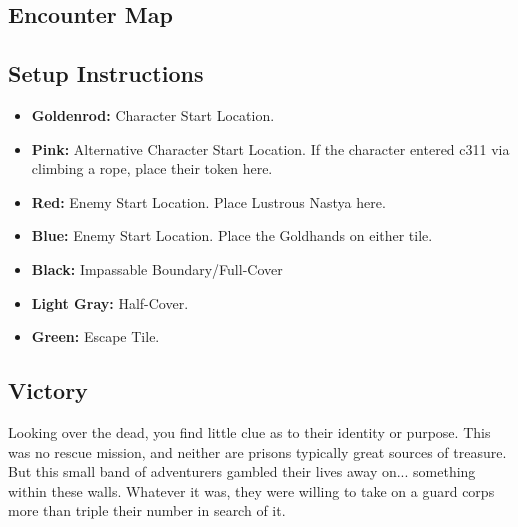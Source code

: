 \subsection*{Encounter Map}
\begin{center}
\end{center}

\subsection*{Setup Instructions}
\begin{itemize}
\item \textbf{Goldenrod:} Character Start Location.
\item \textbf{Pink:} Alternative Character Start Location. If the character entered c311 via climbing a rope, place their token here.
\item \textbf{Red:} Enemy Start Location. Place Lustrous Nastya here.
\item \textbf{Blue:} Enemy Start Location. Place the Goldhands on either tile.
\item \textbf{Black:} Impassable Boundary/Full-Cover
\item \textbf{Light Gray:} Half-Cover.
\item \textbf{Green:} Escape Tile.
\end{itemize}

\pagebreak

\subsection*{Victory}
Looking over the dead, you find little clue as to their identity or purpose. This was no rescue mission, and neither are prisons typically great sources of treasure. But this small band of adventurers gambled their lives away on... something within these walls. Whatever it was, they were willing to take on a guard corps more than triple their number in search of it.\\

